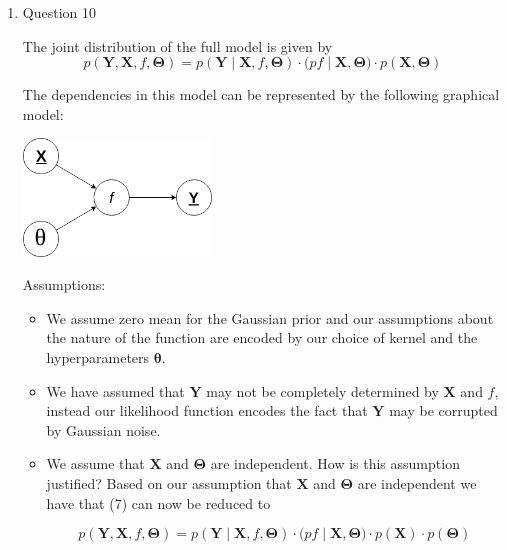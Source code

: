 \documentclass[13pt]{article}
\begin{document}
\begin{enumerate}
  \item{\large Question 10}
  
  The joint distribution of the full model is given by
  \begin{equation}
      p(\mathbf{Y},\mathbf{X},f,\mathbf{\Theta}) = p(\mathbf{Y}\mid\mathbf{X},f,\mathbf{\Theta})\cdot(p{f\mid\mathbf{X}, \mathbf{\Theta})}\cdot{p(\mathbf{X},\mathbf{\Theta})}
  \end{equation}
  
  The dependencies in this model can be represented by the following graphical model:
  
  \begin{center}
      \includegraphics[width=50mm,scale=0.5]{images/FinalGraphicalModel.png}
  \end{center}
  
  Assumptions:
  \begin{itemize}
      \item We assume zero mean for the Gaussian prior and our assumptions about the nature of the function are encoded by our choice of kernel and the hyperparameters $\mathbf{\theta}$.
  \end{itemize}
  \begin{itemize}
      \item We have assumed that $\mathbf{Y}$ may not be completely determined by $\mathbf{X}$ and $f$, instead our likelihood function encodes the fact that $\mathbf{Y}$ may be corrupted by Gaussian noise.
  \end{itemize}
  \begin{itemize}
      \item We assume that $\mathbf{X}$ and $\mathbf{\Theta}$ are independent. How is this assumption justified? Based on our assumption that $\mathbf{X}$ and $\mathbf{\Theta}$ are independent we have that (7) can now be reduced to
      
    \begin{equation}
      p(\mathbf{Y},\mathbf{X},f,\mathbf{\Theta}) = p(\mathbf{Y}\mid\mathbf{X},f,\mathbf{\Theta})\cdot(p{f\mid\mathbf{X}, \mathbf{\Theta})}\cdot{p(\mathbf{X})}\cdot{p(\mathbf{\Theta})}
    \end{equation}
  \end{itemize}
  

\end{enumerate}
\end{document}
